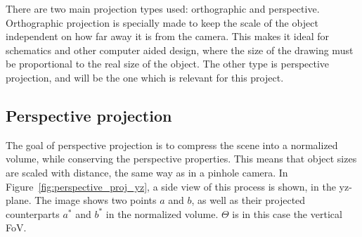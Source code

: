 There are two main projection types used: orthographic and perspective. Orthographic projection is specially made to keep the scale of the object independent on how far away it is from the camera. This makes it ideal for schematics and other computer aided design, where the size of the drawing must be proportional to the real size of the object. The other type is perspective projection, and will be the one which is relevant for this project.

\subsection{Perspective projection}

The goal of perspective projection is to compress the scene into a normalized volume, while conserving the perspective properties. This means that object sizes are scaled with distance, the same way as in a pinhole camera. In Figure~\ref{fig:perspective_proj_yz}, a side view of this process is shown, in the yz-plane. The image shows two points $a$ and $b$, as well as their projected counterparts $a^*$ and $b^*$ in the normalized volume. $\Theta$ is in this case the vertical FoV.

